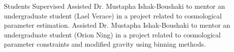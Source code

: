 \begin{rubric}{Students Supervised}
	Assisted Dr. Mustapha Ishak-Boushaki to mentor an undergraduate student (Lael Verace) in a project related to cosmological parameter estimation.
	Assisted Dr. Mustapha Ishak-Boushaki to mentor an undergraduate student (Orion Ning) in a project related to cosmological parameter constraints and modified gravity using binning methods.
\end{rubric}